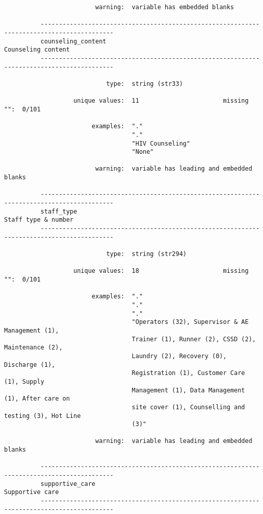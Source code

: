 \documentclass{article}
\begin{document}
\begin{verbatim}
                         warning:  variable has embedded blanks
          
          ------------------------------------------------------------------------------------------
          counseling_content                                                      Counseling content
          ------------------------------------------------------------------------------------------
          
                            type:  string (str33)
          
                   unique values:  11                       missing "":  0/101
          
                        examples:  "."
                                   "."
                                   "HIV Counseling"
                                   "None"
          
                         warning:  variable has leading and embedded blanks
          
          ------------------------------------------------------------------------------------------
          staff_type                                                             Staff type & number
          ------------------------------------------------------------------------------------------
          
                            type:  string (str294)
          
                   unique values:  18                       missing "":  0/101
          
                        examples:  "."
                                   "."
                                   "."
                                   "Operators (32), Supervisor & AE Management (1),
                                   Trainer (1), Runner (2), CSSD (2), Maintenance (2),
                                   Laundry (2), Recovery (0), Discharge (1),
                                   Registration (1), Customer Care (1), Supply
                                   Management (1), Data Management (1), After care on
                                   site cover (1), Counselling and testing (3), Hot Line
                                   (3)"
          
                         warning:  variable has leading and embedded blanks
          
          ------------------------------------------------------------------------------------------
          supportive_care                                                            Supportive care
          ------------------------------------------------------------------------------------------
          

\end{verbatim}
\end{document}
